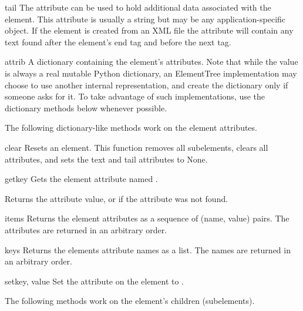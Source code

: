 \begin{memberdesc}{tail}
The  attribute can be used to hold additional data
associated with the element.
This attribute is usually a string but may be any application-specific object.
If the element is created from an XML file the attribute will contain
any text found after the element's end tag and before the next tag.
\end{memberdesc}

\begin{memberdesc}{attrib}
A dictionary containing the element's attributes.
Note that while the  value is always a real mutable Python
dictionary, an ElementTree implementation may choose to use another
internal representation, and create the dictionary only if someone
asks for it. To take advantage of such implementations, use the
dictionary methods below whenever possible.
\end{memberdesc}

The following dictionary-like methods work on the element attributes.

\begin{methoddesc}{clear}{}
Resets an element.  This function removes all subelements, clears
all attributes, and sets the text and tail attributes to None.
\end{methoddesc}

\begin{methoddesc}{get}{key}
Gets the element attribute named .

Returns the attribute value, or  if the
attribute was not found.
\end{methoddesc}

\begin{methoddesc}{items}{}
Returns the element attributes as a sequence of (name, value) pairs.
The attributes are returned in an arbitrary order.
\end{methoddesc}

\begin{methoddesc}{keys}{}
Returns the elements attribute names as a list.
The names are returned in an arbitrary order.
\end{methoddesc}

\begin{methoddesc}{set}{key, value}
Set the attribute  on the element to .  
\end{methoddesc}

The following methods work on the element's children (subelements).

